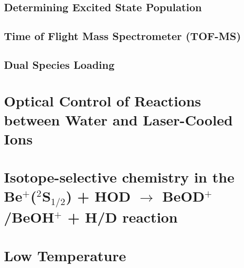 \documentclass [PhD,nolistoftables,scheader] {uclathes}
\begin{document}
	\section{Determining Excited State Population}
	

	\section{Time of Flight Mass Spectrometer (TOF-MS)} \label{sec: TOF}
	
	
	\section{Dual Species Loading} \label{sec: dual loading}
	

\chapter{Optical Control of Reactions between Water and Laser-Cooled  Ions} \label{sec: Be+H2O}
%	


\chapter{Isotope-selective chemistry in the Be$^+$($^2$S$_{1/2}$) + HOD $\rightarrow$ BeOD$^+$/BeOH$^+$ + H/D reaction}


%	
%	
%	

\chapter{Low Temperature } \label{sec: [HCO]}

	
\end{document}
